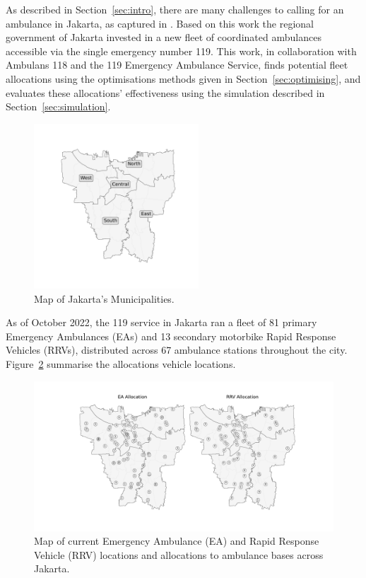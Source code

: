\documentclass[preprint,12pt]{elsarticle}
\begin{document}
As described in Section~\ref{sec:intro}, there are many challenges to calling
for an ambulance in Jakarta, as captured in \cite{BriceSyaribahNoor2022Esui}.
Based on this work the regional government of Jakarta invested in a new fleet
of coordinated ambulances accessible via the single emergency number 119.
This work, in collaboration with Ambulans 118 and the 119 Emergency Ambulance
Service, finds potential fleet allocations using the optimisations methods
given in Section~\ref{sec:optimising}, and evaluates these allocations'
effectiveness using the simulation described in Section~\ref{sec:simulation}.

\begin{figure}
\begin{center}
\includegraphics[width=0.55\textwidth,trim={0 6cm 0 5cm}, clip]{img/jakarta_region_names.pdf}
\end{center}
\caption{Map of Jakarta's Municipalities.}
\label{fig:region_names}
\end{figure}

As of October 2022, the 119 service in Jakarta ran a fleet of 81 primary
Emergency Ambulances (EAs) and 13 secondary motorbike Rapid Response Vehicles
(RRVs), distributed across 67 ambulance stations throughout the city.
Figure~\ref{fig:current_allocation} summarise the allocations vehicle
locations.

\begin{figure}
\begin{center}
\includegraphics[width=\textwidth]{img/map_current}
\caption{Map of current Emergency Ambulance (EA) and Rapid Response Vehicle
         (RRV) locations and allocations to ambulance bases across Jakarta.}
\label{fig:current_allocation}
\end{center}
\end{figure}
\end{document}
